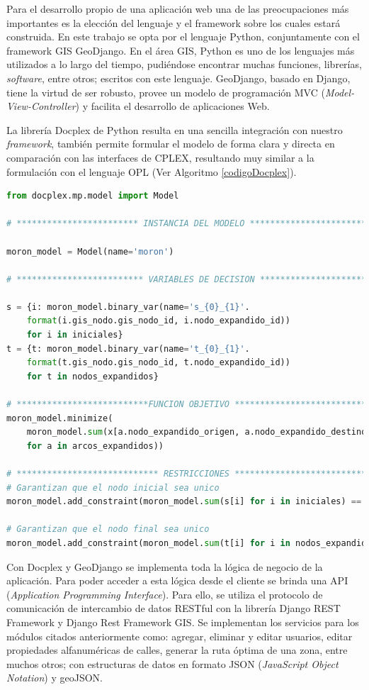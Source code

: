 Para el desarrollo propio de una aplicación web una de las preocupaciones más importantes es la elección del lenguaje y el framework sobre los cuales estará construida. En este trabajo se opta por el lenguaje Python, conjuntamente con el framework GIS GeoDjango. En el área GIS, Python es uno de los lenguajes más utilizados a lo largo del tiempo, pudiéndose encontrar muchas funciones, librerías, \textit{software}, entre otros; escritos con este lenguaje. GeoDjango, basado en Django, tiene la virtud de ser robusto, provee un modelo de programación MVC (\textit{Model-View-Controller}) y facilita el desarrollo de aplicaciones Web.

La librería Docplex de Python resulta en una sencilla integración con nuestro \textit{framework}, también permite formular el modelo de forma clara y directa en comparación con las interfaces de CPLEX, resultando muy similar a la formulación con el lenguaje OPL (Ver Algoritmo \ref{codigoDocplex}).

\hfill
\begin{lstlisting}[language=Python,caption={Fragmento de código en docplex.},label={codigoDocplex}]
from docplex.mp.model import Model

# ************************ INSTANCIA DEL MODELO ******************************

moron_model = Model(name='moron')
    
# ************************* VARIABLES DE DECISION ****************************

s = {i: moron_model.binary_var(name='s_{0}_{1}'.
    format(i.gis_nodo.gis_nodo_id, i.nodo_expandido_id)) 
    for i in iniciales}
t = {t: moron_model.binary_var(name='t_{0}_{1}'.
    format(t.gis_nodo.gis_nodo_id, t.nodo_expandido_id)) 
    for t in nodos_expandidos}

# **************************FUNCION OBJETIVO *********************************
moron_model.minimize(
    moron_model.sum(x[a.nodo_expandido_origen, a.nodo_expandido_destino] * a.peso 
    for a in arcos_expandidos))
    
# **************************** RESTRICCIONES *********************************
# Garantizan que el nodo inicial sea unico
moron_model.add_constraint(moron_model.sum(s[i] for i in iniciales) == 1)

# Garantizan que el nodo final sea unico
moron_model.add_constraint(moron_model.sum(t[i] for i in nodos_expandidos) == 1))
\end{lstlisting}

Con Docplex y GeoDjango se implementa toda la lógica de negocio de la aplicación. Para poder acceder a esta lógica desde el cliente se brinda una API (\textit{Application Programming Interface}). Para ello, se utiliza el protocolo de comunicación de intercambio de datos RESTful con la librería Django REST Framework y Django Rest Framework GIS. Se implementan los servicios para los módulos citados anteriormente como: agregar, eliminar y editar usuarios, editar propiedades alfanuméricas de calles, generar la ruta óptima de una zona, entre muchos otros; con estructuras de datos en formato JSON (\textit{JavaScript Object Notation}) y geoJSON.

